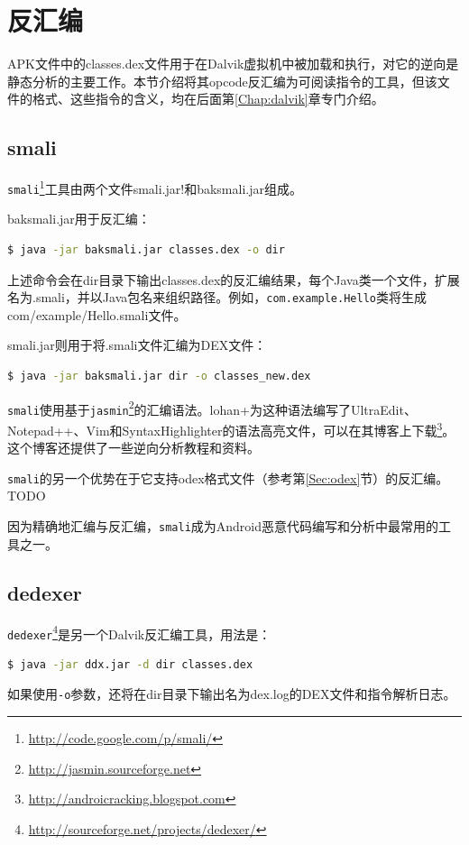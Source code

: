 \section{反汇编}
APK文件中的classes.dex文件用于在Dalvik虚拟机中被加载和执行，对它的逆向是静态分析的主要工作。本节介绍将其opcode反汇编为可阅读指令的工具，但该文件的格式、这些指令的含义，均在后面第\ref{Chap:dalvik}章专门介绍。

\subsection{smali}
\lstinline!smali!\footnote{\url{http://code.google.com/p/smali/}}工具由两个文件smali.jar!和baksmali.jar组成。

baksmali.jar用于反汇编：
\begin{lstlisting}[language=bash, numbers=none]
 $ java -jar baksmali.jar classes.dex -o dir
\end{lstlisting}
上述命令会在dir目录下输出classes.dex的反汇编结果，每个Java类一个文件，扩展名为.smali，并以Java包名来组织路径。例如，\lstinline!com.example.Hello!类将生成com/example/Hello.smali文件。

smali.jar则用于将.smali文件汇编为DEX文件：
\begin{lstlisting}[language=bash, numbers=none]
 $ java -jar baksmali.jar dir -o classes_new.dex
\end{lstlisting}

\lstinline!smali!使用基于\lstinline!jasmin!\footnote{\url{http://jasmin.sourceforge.net}}的汇编语法。lohan+为这种语法编写了UltraEdit、Notepad++、Vim和SyntaxHighlighter的语法高亮文件，可以在其博客上下载\footnote{\url{http://androicracking.blogspot.com}}。这个博客还提供了一些逆向分析教程和资料。

\lstinline!smali!的另一个优势在于它支持odex格式文件（参考第\ref{Sec:odex}节）的反汇编。TODO

因为精确地汇编与反汇编，\lstinline!smali!成为Android恶意代码编写和分析中最常用的工具之一。

\subsection{dedexer}
\lstinline!dedexer!\footnote{\url{http://sourceforge.net/projects/dedexer/}}是另一个Dalvik反汇编工具，用法是：
\begin{lstlisting}[language=bash, numbers=none]
 $ java -jar ddx.jar -d dir classes.dex
\end{lstlisting}
如果使用\lstinline!-o!参数，还将在dir目录下输出名为dex.log的DEX文件和指令解析日志。


